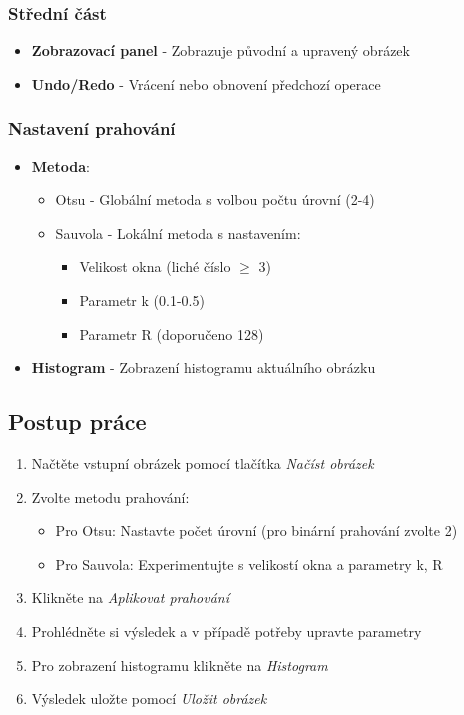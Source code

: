 \documentclass[12pt,a4paper]{article}
\begin{document}
\subsubsection{Střední část}
\begin{itemize}
\item \textbf{Zobrazovací panel} - Zobrazuje původní a upravený obrázek
\item \textbf{Undo/Redo} - Vrácení nebo obnovení předchozí operace
\end{itemize}

\subsubsection{Nastavení prahování}
\begin{itemize}
\item \textbf{Metoda}:
\begin{itemize}
\item Otsu - Globální metoda s volbou počtu úrovní (2-4)
\item Sauvola - Lokální metoda s nastavením:
  \begin{itemize}
  \item Velikost okna (liché číslo $\geq$ 3)
  \item Parametr k (0.1-0.5)
  \item Parametr R (doporučeno 128)
  \end{itemize}
\end{itemize}
\item \textbf{Histogram} - Zobrazení histogramu aktuálního obrázku
\end{itemize}

\subsection{Postup práce}
\begin{enumerate}
\item Načtěte vstupní obrázek pomocí tlačítka \textit{Načíst obrázek}
\item Zvolte metodu prahování:
\begin{itemize}
\item Pro Otsu: Nastavte počet úrovní (pro binární prahování zvolte 2)
\item Pro Sauvola: Experimentujte s velikostí okna a parametry k, R
\end{itemize}
\item Klikněte na \textit{Aplikovat prahování}
\item Prohlédněte si výsledek a v případě potřeby upravte parametry
\item Pro zobrazení histogramu klikněte na \textit{Histogram}
\item Výsledek uložte pomocí \textit{Uložit obrázek}
\end{enumerate}
\end{document}
